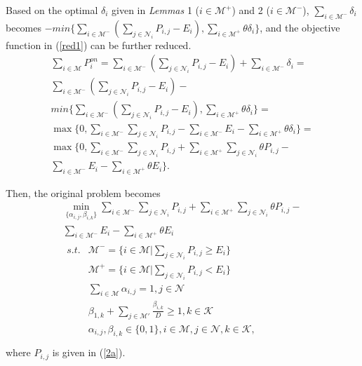 \documentclass[journal,12pt,onecolumn]{IEEEtran}
\begin{document}
 Based on the optimal $\delta_i$ given in \emph{Lemmas} 1 ($i\in\mathcal{M}^+$) and 2 ($i\in\mathcal{M}^-$), $\sum\nolimits_{i\in\mathcal{M}^-}\delta_i$ becomes $-min\{\sum\nolimits_{i\in\mathcal{M}^-}(\sum\nolimits_{j\in\mathcal{N}_i}P_{i,j}-E_i),\sum\nolimits_{i\in\mathcal{M}^+}\theta\delta_{i}\}$, and the objective function in (\ref{red1}) can be further reduced.
\begin{equation}\label{red}
\begin{array}{l}
\sum\limits_{i\in\mathcal{M}}{P_i^{on}}=\sum\limits_{i\in\mathcal{M}^-}({\sum\limits_{j\in\mathcal{N}_i}P_{i,j}}- E_i)+\sum\limits_{i\in\mathcal{M}^-}\delta_i=\\
\sum\limits_{i\in\mathcal{M}^-}({\sum\limits_{j\in\mathcal{N}_i}P_{i,j}}- E_i)-\\
min\{\sum\limits_{i\in\mathcal{M}^-}(\sum\limits_{j\in\mathcal{N}_i}P_{i,j}-E_i),\sum\limits_{i\in\mathcal{M}^+}\theta\delta_{i}\}=\\
\max\{0,\sum\limits_{i\in\mathcal{M}^-}{\sum\limits_{j\in\mathcal{N}_i}P_{i,j}}- \sum\limits_{i\in\mathcal{M}^-}E_i-\sum\limits_{i\in\mathcal{M}^+}\theta\delta_{i}\}=\\
\max\{0,\sum\limits_{i\in\mathcal{M}^-}{\sum\limits_{j\in\mathcal{N}_i}P_{i,j}}+\sum\limits_{i\in\mathcal{M}^+}{\sum\limits_{j\in\mathcal{N}_i}\theta P_{i,j}}- \\
\sum\limits_{i\in\mathcal{M}^-}E_i- \sum\limits_{i\in\mathcal{M}^+}\theta E_i\}.
\end{array}
\end{equation}



Then, the original problem becomes
\begin{equation}\label{obj1}
\begin{array}{l}
\mathop {\min }\limits_{\{{\alpha_{i,j},\beta_{i,k}}\}}  \sum\limits_{i\in\mathcal{M}^-}{\sum\limits_{j\in\mathcal{N}_i}P_{i,j}} + \sum\limits_{i\in\mathcal{M}^+}{\sum\limits_{j\in\mathcal{N}_i}\theta P_{i,j}}-\\
\sum\limits_{i\in\mathcal{M}^-}E_i- \sum\limits_{i\in\mathcal{M}^+}\theta E_i\\
\begin{array}{*{20}{l}}
{s.t.}&\mathcal{M}^-=\{i\in\mathcal{M}|\sum\limits_{j\in\mathcal{N}_i}P_{i,j}\ge E_i\}\\
&\mathcal{M}^+=\{i\in\mathcal{M}|\sum\limits_{j\in\mathcal{N}_i}P_{i,j}< E_i\}\\
&\sum\limits_{i\in\mathcal{M}}\alpha_{i,j}=1,j\in\mathcal{N}\\
&\beta_{1,k}+\sum\limits_{j\in\mathcal{M'}}\frac{\beta_{i,k}}{D}\ge 1, k\in\mathcal{K}\\
&{\alpha_{i,j},\beta_{i,k}}\in\{0,1\},i\in\mathcal{M},j\in\mathcal{N},k\in\mathcal{K},\\
\end{array}
\end{array}
\end{equation}
where $P_{i,j}$ is given in (\ref{2a}).
\end{document}
